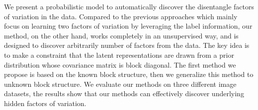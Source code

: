 We present a probabilistic model to automatically discover the disentangle factors of variation in the data. Compared to the previous approaches which mainly focus on learning two factors of variation by leveraging the label information, our method, on the other hand, works completely in an unsupervised way, and is designed to discover arbitrarily number of factors from the data. The key idea is to make a constraint that the latent representations are drawn from a prior distribution whose covariance matrix is block diagonal. The first method we propose is based on the known block structure, then we generalize this method to unknown block structure. We evaluate our methods on three different image datasets, the results show that our methods can effectively discover underlying hidden factors of variation. 